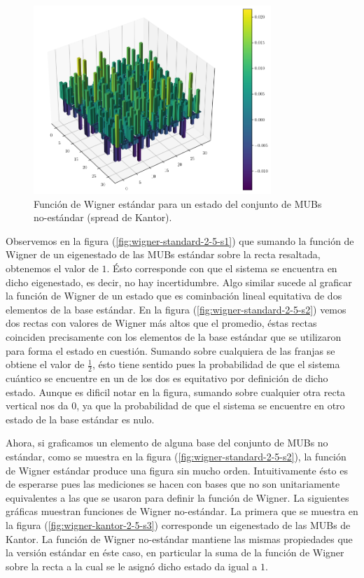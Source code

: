 \documentclass[a4paper]{report}
\begin{document}
  \begin{figure}[ht]
    \centering
    \includegraphics[width=0.8\textwidth]{imgs/wigner-standard-2-5-s3.png}
    \caption{Función de Wigner estándar para un estado del
    conjunto de MUBs no-estándar (spread de Kantor).}
    \label{fig:wigner-standard-2-5-s3}
  \end{figure}

  Observemos en la figura (\ref{fig:wigner-standard-2-5-s1})
  que sumando la función de Wigner de un eigenestado de las
  MUBs estándar sobre la recta resaltada, obtenemos el valor
  de $1$. Ésto corresponde con que el sistema se encuentra
  en dicho eigenestado, es decir, no hay incertidumbre. Algo
  similar sucede al graficar la función de Wigner de un
  estado que es cominbación lineal equitativa de dos
  elementos de la base estándar. En la figura
  (\ref{fig:wigner-standard-2-5-s2}) vemos dos rectas con
  valores de Wigner más altos que el promedio, éstas rectas
  coinciden precisamente con los elementos de la base
  estándar que se utilizaron para forma el estado en
  cuestión. Sumando sobre cualquiera de las franjas se
  obtiene el valor de $\frac{1}{2}$, ésto tiene sentido pues
  la probabilidad de que el sistema cuántico se encuentre en
  un de los dos es equitativo por definición de dicho
  estado.  Aunque es dificil notar en la figura, sumando
  sobre cualquier otra recta vertical nos da $0$, ya que la
  probabilidad de que el sistema se encuentre en otro estado
  de la base estándar es nulo.

  Ahora, si graficamos un elemento de alguna base del
  conjunto de MUBs no estándar, como se muestra en la figura
  (\ref{fig:wigner-standard-2-5-s2}), la función de Wigner
  estándar produce una figura sin mucho orden.
  Intuitivamente ésto es de esperarse pues las mediciones se
  hacen con bases que no son unitariamente equivalentes a
  las que se usaron para definir la función de Wigner. La
  siguientes gráficas muestran funciones de Wigner
  no-estándar. La primera que se muestra en la figura
  (\ref{fig:wigner-kantor-2-5-s3}) corresponde un
  eigenestado de las MUBs de Kantor. La función de Wigner
  no-estándar mantiene las mismas propiedades que la versión
  estándar en éste caso, en particular la suma de la función
  de Wigner sobre la recta a la cual se le asignó dicho
  estado da igual a $1$. 
\end{document}
